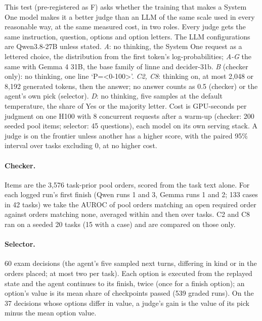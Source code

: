 \documentclass[11pt]{article}
\begin{document}
This test (pre-registered as F) asks whether the training that makes a System One model makes it a better judge than
an LLM of the same scale used in every reasonable way, at the same measured cost, in two roles. Every judge gets the
same instruction, question, options and option letters. The LLM configurations are Qwen3.8-27B unless stated.
\emph{A}: no thinking, the System One request as a lettered choice, the distribution from the first token's
log-probabilities; \emph{A-G} the same with Gemma 4 31B, the base family of linne and decider-31b. \emph{B} (checker
only): no thinking, one line `P=<0-100>'. \emph{C2, C8}: thinking on, at most 2,048 or 8,192 generated tokens, then the
answer; no answer counts as 0.5 (checker) or the agent's own pick (selector). \emph{D}: no thinking, five samples at
the default temperature, the share of Yes or the majority letter. Cost is GPU-seconds per judgment on one H100 with 8
concurrent requests after a warm-up (checker: 200 seeded pool items; selector: 45 questions), each model on its own
serving stack. A judge is on the frontier unless another has a higher score, with the paired 95\% interval over tasks
excluding 0, at no higher cost.

\paragraph{Checker.} Items are the 3,576 task-prior pool orders, scored from the task text alone. For each logged run's
first finish (Qwen runs 1 and 3, Gemma runs 1 and 2; 133 cases in 42 tasks) we take the AUROC of pool orders matching
an open required order against orders matching none, averaged within and then over tasks. C2 and C8 ran on a seeded 20
tasks (15 with a case) and are compared on those only.

\paragraph{Selector.} 60 exam decisions (the agent's five sampled next turns, differing in kind or in the orders
placed; at most two per task). Each option is executed from the replayed state and the agent continues to its finish,
twice (once for a finish option); an option's value is its mean share of checkpoints passed (539 graded runs). On the
37 decisions whose options differ in value, a judge's gain is the value of its pick minus the mean option value.
\end{document}
